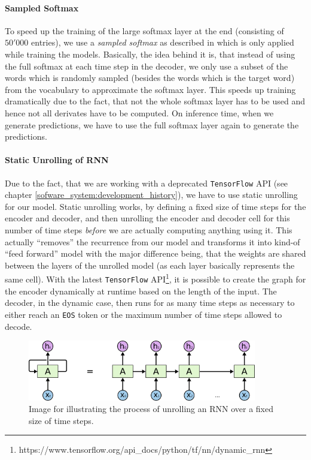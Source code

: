 \paragraph{Sampled Softmax} To speed up the training of the large softmax layer at the end (consisting of $50'000$ entries), we use a \emph{sampled softmax} as described in \cite{Sebastien:2014} which is only applied while training the models. Basically, the idea behind it is, that instead of using the full softmax at each time step in the decoder, we only use a subset of the words which is randomly sampled (besides the words which is the target word) from the vocabulary to approximate the softmax layer. This speeds up training dramatically due to the fact, that not the whole softmax layer has to be used and hence not all derivates have to be computed. On inference time, when we generate predictions, we have to use the full softmax layer again to generate the predictions.

\paragraph{Static Unrolling of RNN} Due to the fact, that we are working with a deprecated \texttt{TensorFlow} API (see chapter \ref{sofware_system:development_history}), we have to use static unrolling for our model. Static unrolling works, by defining a fixed size of time steps for the encoder and decoder, and then unrolling the encoder and decoder cell for this number of time steps \emph{before} we are actually computing anything using it. This actually ``removes'' the recurrence from our model and transforms it into kind-of ``feed forward'' model with the major difference being, that the weights are shared between the layers of the unrolled model (as each layer basically represents the same cell). With the latest \texttt{TensorFlow} API\footnote{https://www.tensorflow.org/api\_docs/python/tf/nn/dynamic\_rnn}, it is possible to create the graph for the encoder dynamically at runtime based on the length of the input. The decoder, in the dynamic case, then runs for as many time steps as necessary to either reach an \texttt{EOS} token or the maximum number of time steps allowed to decode.

\begin{figure}
	\label{methods:static_unrolling:unrolled_rnn}
	\centering
	\includegraphics[width=10cm]{img/rnn_unrolled}
	\caption{Image for illustrating the process of unrolling an RNN over a fixed size of time steps.\protect\footnotemark}
\end{figure}

